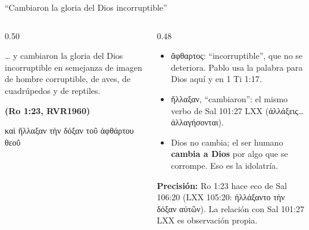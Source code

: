 \documentclass[hyperref={bookmarks=false},aspectratio=169]{beamer}
\newcommand{\grc}[1]{\foreignlanguage{ancientgreek}{#1}}
\newcommand{\fuente}[1]{\par\hfill{\upshape\bfseries\footnotesize\textcolor{azul}{#1}}}
\newcommand{\destacar}[1]{\textbf{\textcolor{azul}{#1}}}
\newcommand{\precision}[1]{{\footnotesize\color{gris}\textbf{Precisión:} #1}}
\begin{document}
\begin{frame}{``Cambiaron la gloria del Dios incorruptible''}
\begin{columns}[t,onlytextwidth]
\begin{column}{0.50\textwidth}
\begin{cita}\ldots{} y cambiaron la gloria del Dios incorruptible en semejanza de imagen de hombre corruptible, de aves, de cuadrúpedos y de reptiles.\fuente{(Ro 1:23, RVR1960)}\end{cita}
\begin{center}\grc{καὶ ἤλλαξαν τὴν δόξαν τοῦ ἀφθάρτου θεοῦ}\end{center}
\end{column}
\begin{column}{0.48\textwidth}\small
\begin{itemize}
\item \grc{ἄφθαρτος}: ``incorruptible'', que no se deteriora. Pablo usa la palabra para Dios aquí y en 1 Ti 1:17.
\item \grc{ἤλλαξαν}, ``cambiaron'': el mismo verbo de Sal 101:27 LXX (\grc{ἀλλάξεις}\ldots{} \grc{ἀλλαγήσονται}).
\item Dios no cambia; el ser humano \destacar{cambia a Dios} por algo que se corrompe. Eso es la idolatría.
\end{itemize}
\precision{Ro 1:23 hace eco de Sal 106:20 (LXX 105:20: \grc{ἠλλάξαντο τὴν δόξαν αὐτῶν}). La relación con Sal 101:27 LXX es observación propia.}
\end{column}
\end{columns}
\end{frame}
\end{document}
